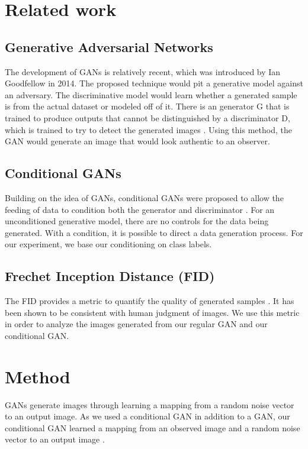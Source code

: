 \documentclass[10pt,twocolumn,letterpaper]{article}
\begin{document}
    \section{Related work}
    
    \subsection{Generative Adversarial Networks}
    The development of GANs is relatively recent, which was introduced by Ian Goodfellow in 2014. The proposed technique would pit a generative model against an adversary. The discriminative model would learn whether a generated sample is from the actual dataset or modeled off of it. There is an generator G that is trained to produce outputs that cannot be distinguished by a discriminator D, which is trained to try to detect the generated images \cite{Goodfellow}. Using this method, the GAN would generate an image that would look authentic to an observer.
    
    \subsection{Conditional GANs}
    Building on the idea of GANs, conditional GANs were proposed to allow the feeding of data to condition both the generator and discriminator \cite{Mirza}. For an unconditioned generative model, there are no controls for the data being generated. With a condition, it is possible to direct a data generation process. For our experiment, we base our conditioning on class labels.
    
    \subsection{Frechet Inception Distance (FID)}
    The FID provides a metric to quantify the quality of generated samples \cite{Lucic}. It has been shown to be consistent with human judgment of images. We use this metric in order to analyze the images generated from our regular GAN and our conditional GAN.
    \section{Method}
    GANs generate images through learning a mapping from a random noise vector to an output image. As we used a conditional GAN in addition to a GAN, our conditional GAN learned a mapping from an observed image and a random noise vector to an output image \cite{Isola}.
\end{document}

